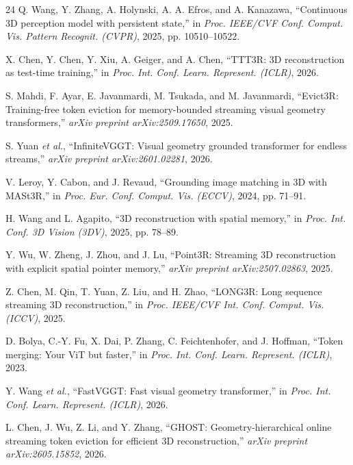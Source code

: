 \documentclass[10pt]{article}
\begin{document}
\begin{thebibliography}{24}
Q. Wang, Y. Zhang, A. Holynski, A. A. Efros, and A. Kanazawa,
``Continuous {3D} perception model with persistent state,'' in
\textit{Proc. IEEE/CVF Conf. Comput. Vis. Pattern Recognit. (CVPR)}, 2025,
pp. 10510--10522.

X. Chen, Y. Chen, Y. Xiu, A. Geiger, and A. Chen,
``{TTT3R}: {3D} reconstruction as test-time training,'' in
\textit{Proc. Int. Conf. Learn. Represent. (ICLR)}, 2026.

S. Mahdi, F. Ayar, E. Javanmardi, M. Tsukada, and M. Javanmardi,
``{Evict3R}: Training-free token eviction for memory-bounded streaming visual
geometry transformers,'' \textit{arXiv preprint arXiv:2509.17650}, 2025.

S. Yuan \textit{et al.},
``{InfiniteVGGT}: Visual geometry grounded transformer for endless streams,''
\textit{arXiv preprint arXiv:2601.02281}, 2026.

V. Leroy, Y. Cabon, and J. Revaud,
``Grounding image matching in {3D} with {MASt3R},'' in
\textit{Proc. Eur. Conf. Comput. Vis. (ECCV)}, 2024, pp. 71--91.

H. Wang and L. Agapito,
``{3D} reconstruction with spatial memory,'' in
\textit{Proc. Int. Conf. 3D Vision (3DV)}, 2025, pp. 78--89.

Y. Wu, W. Zheng, J. Zhou, and J. Lu,
``{Point3R}: Streaming {3D} reconstruction with explicit spatial pointer
memory,'' \textit{arXiv preprint arXiv:2507.02863}, 2025.

Z. Chen, M. Qin, T. Yuan, Z. Liu, and H. Zhao,
``{LONG3R}: Long sequence streaming {3D} reconstruction,'' in
\textit{Proc. IEEE/CVF Int. Conf. Comput. Vis. (ICCV)}, 2025.

D. Bolya, C.-Y. Fu, X. Dai, P. Zhang, C. Feichtenhofer, and J. Hoffman,
``Token merging: Your {ViT} but faster,'' in
\textit{Proc. Int. Conf. Learn. Represent. (ICLR)}, 2023.

Y. Wang \textit{et al.},
``{FastVGGT}: Fast visual geometry transformer,'' in
\textit{Proc. Int. Conf. Learn. Represent. (ICLR)}, 2026.

L. Chen, J. Wu, Z. Li, and Y. Zhang,
``{GHOST}: Geometry-hierarchical online streaming token eviction for
efficient {3D} reconstruction,'' \textit{arXiv preprint arXiv:2605.15852},
2026.


\end{thebibliography}
\end{document}
